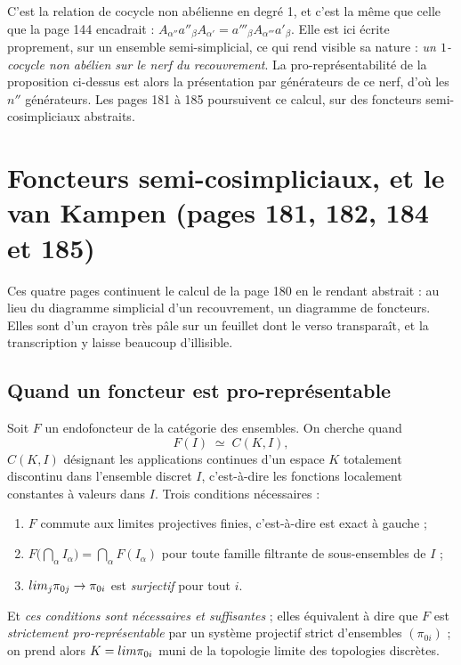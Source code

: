 \documentclass[11pt,a4paper]{article}
\begin{document}
C'est la relation de cocycle non abélienne en degré 1, et c'est la même que
celle que la page 144 encadrait : $A_{\alpha''} a''_{\beta} A_{\alpha'} =
a'''_{\beta} A_{\alpha'''} a'_{\beta}$. Elle est ici écrite proprement, sur
un ensemble semi-simplicial, ce qui rend visible sa nature : \emph{un
$1$-cocycle non abélien sur le nerf du recouvrement}. La
pro-représentabilité de la proposition ci-dessus est alors
la présentation par générateurs de ce nerf, d'où les $n''$ générateurs. Les
pages 181 à 185 poursuivent ce calcul, sur des foncteurs semi-cosimpliciaux
abstraits.

\section*{Foncteurs semi-cosimpliciaux, et le van Kampen (pages 181, 182, 184 et 185)}

Ces quatre pages continuent le calcul de la page 180 en le rendant abstrait :
au lieu du diagramme simplicial d'un recouvrement, un diagramme de foncteurs.
Elles sont d'un crayon très pâle sur un feuillet dont le verso transparaît, et
la transcription y laisse beaucoup d'illisible.

\subsection*{Quand un foncteur est pro-représentable}

Soit $F$ un endofoncteur de la catégorie des ensembles. On cherche quand
\[
  F(I) \;\simeq\; C(K, I) ,
\]
$C(K,I)$ désignant les applications continues d'un espace $K$ totalement
discontinu dans l'ensemble discret $I$, c'est-à-dire les fonctions
localement constantes à valeurs dans $I$. Trois conditions nécessaires :

\begin{enumerate}
  \item[a)] $F$ commute aux limites projectives finies, c'est-à-dire est exact
    à gauche ;
  \item[b)] $F\bigl(\bigcap_{\alpha} I_{\alpha}\bigr) =
    \bigcap_{\alpha} F(I_{\alpha})$ pour toute famille filtrante de
    sous-ensembles de $I$ ;
  \item[c)] $\varprojlim_{j} \pi_{0j} \to \pi_{0i}$ est \emph{surjectif} pour
    tout $i$.
\end{enumerate}

Et \emph{ces conditions sont nécessaires et suffisantes} ; elles
équivalent à dire que $F$ est \emph{strictement pro-représentable} par un
système projectif strict d'ensembles $(\pi_{0i})$ ; on prend alors
$K = \varprojlim \pi_{0i}$ muni de la topologie limite des topologies discrètes.
\end{document}
